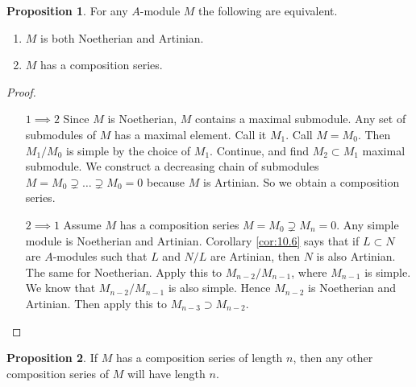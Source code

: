 \documentclass{article}
\theoremstyle{definition}\newtheorem{definition}{Definition}[section]
\theoremstyle{definition}\newtheorem{remark}[definition]{Remark}
\theoremstyle{definition}\newtheorem*{example}{Example}
\theoremstyle{definition}\newtheorem*{note}{Note}
\newtheorem{proposition}[definition]{Proposition}
\begin{document}
\begin{proposition}
For any $ A $-module $ M $ the following are equivalent.
\begin{enumerate}
\item $ M $ is both Noetherian and Artinian.
\item $ M $ has a composition series.
\end{enumerate}
\end{proposition}

\begin{proof}
\hfill
\begin{itemize}[leftmargin=0.5in]
\item[$ 1 \implies 2 $] Since $ M $ is Noetherian, $ M $ contains a maximal submodule. Any set of submodules of $ M $ has a maximal element. Call it $ M_1 $. Call $ M = M_0 $. Then $ M_1 / M_0 $ is simple by the choice of $ M_1 $. Continue, and find $ M_2 \subset M_1 $ maximal submodule. We construct a decreasing chain of submodules $ M = M_0 \supsetneq \dots \supsetneq M_0 = 0 $ because $ M $ is Artinian. So we obtain a composition series.
\item[$ 2 \implies 1 $] Assume $ M $ has a composition series $ M = M_0 \supsetneq M_n = 0 $. Any simple module is Noetherian and Artinian. Corollary \ref{cor:10.6} says that if $ L \subset N $ are $ A $-modules such that $ L $ and $ N / L $ are Artinian, then $ N $ is also Artinian. The same for Noetherian. Apply this to $ M_{n - 2} / M_{n - 1} $, where $ M_{n - 1} $ is simple. We know that $ M_{n - 2} / M_{n - 1} $ is also simple. Hence $ M_{n - 2} $ is Noetherian and Artinian. Then apply this to $ M_{n - 3} \supset M_{n - 2} $.
\end{itemize}
\end{proof}

\begin{proposition}
If $ M $ has a composition series of length $ n $, then any other composition series of $ M $ will have length $ n $.
\end{proposition}
\end{document}
